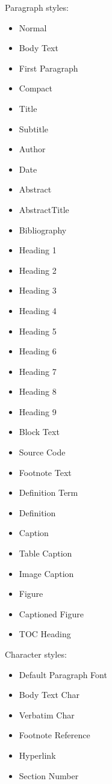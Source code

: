 \documentclass[
  a4paper,
]{article}
\providecommand{\tightlist}{%
  \setlength{\itemsep}{0pt}\setlength{\parskip}{0pt}}
\begin{document}
\begin{description}
\begin{description}
Paragraph styles:

\begin{itemize}
\tightlist
\item
  Normal
\item
  Body Text
\item
  First Paragraph
\item
  Compact
\item
  Title
\item
  Subtitle
\item
  Author
\item
  Date
\item
  Abstract
\item
  AbstractTitle
\item
  Bibliography
\item
  Heading 1
\item
  Heading 2
\item
  Heading 3
\item
  Heading 4
\item
  Heading 5
\item
  Heading 6
\item
  Heading 7
\item
  Heading 8
\item
  Heading 9
\item
  Block Text
\item
  Source Code
\item
  Footnote Text
\item
  Definition Term
\item
  Definition
\item
  Caption
\item
  Table Caption
\item
  Image Caption
\item
  Figure
\item
  Captioned Figure
\item
  TOC Heading
\end{itemize}

Character styles:

\begin{itemize}
\tightlist
\item
  Default Paragraph Font
\item
  Body Text Char
\item
  Verbatim Char
\item
  Footnote Reference
\item
  Hyperlink
\item
  Section Number
\end{itemize}


\end{description}
\end{description}
\end{document}
